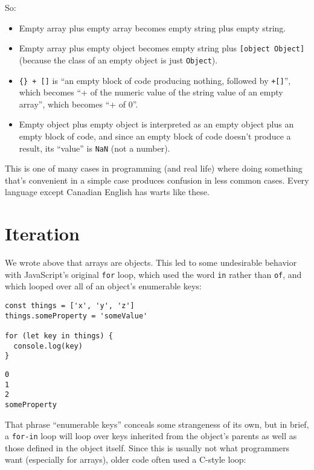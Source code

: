 So:

\begin{itemize}
\item
  Empty array plus empty array becomes empty string plus empty string.
\item
  Empty array plus empty object becomes empty string plus \texttt{{[}object\ Object{]}}
  (because the class of an empty object is just \texttt{Object}).
\item
  \texttt{\{\}\ +\ {[}{]}} is ``an empty block of code producing nothing, followed by \texttt{+{[}{]}}'',
  which becomes ``+ of the numeric value of the string value of an empty array'',
  which becomes ``+ of 0''.
\item
  Empty object plus empty object is interpreted as an empty object plus an empty block of code,
  and since an empty block of code doesn't produce a result,
  its ``value'' is \texttt{NaN} (not a number).
\end{itemize}

This is one of many cases in programming (and real life) where
doing something that's convenient in a simple case
produces confusion in less common cases.
Every language except Canadian English has warts like these.

\section{Iteration}\label{s:legacy-iteration}

We wrote above that arrays are objects.
This led to some undesirable behavior with JavaScript's original \texttt{for} loop,
which used the word \texttt{in} rather than \texttt{of},
and which looped over all of an object's enumerable keys:

\begin{verbatim}
const things = ['x', 'y', 'z']
things.someProperty = 'someValue'

for (let key in things) {
  console.log(key)
}
\end{verbatim}

\begin{verbatim}
0
1
2
someProperty
\end{verbatim}

That phrase ``enumerable keys'' conceals some strangeness of its own,
but in brief,
a \texttt{for-in} loop will loop over keys inherited from the object's parents
as well as those defined in the object itself.
Since this is usually not what programmers want (especially for arrays),
older code often used a C-style loop:

